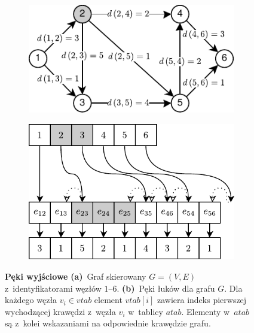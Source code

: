 \begin{figure}[!htbp]
	\centering
	\null\hfill
	\begin{subfigure}[b]{0.54\textwidth}
		\includegraphics[width=\textwidth]{Chapter_I/FORWARD-STAR-Exapmle/a.pdf}
		\caption{}
		\label{fig:forwardStarRepresentation:a}
	\end{subfigure}%
	\hfill
	\begin{subfigure}[b]{0.43\textwidth}
		\includegraphics[width=\textwidth]{Chapter_I/FORWARD-STAR-Exapmle/b.pdf}
		\caption{}
		\label{fig:forwardStarRepresentation:b}
	\end{subfigure}
	\hfill\null
	\caption{
		\textbf{Pęki wyjściowe}
		\textbf{(a)}~Graf skierowany $G = \left( V, E \right)$ z~identyfikatorami węzłów $1$--$6$.
		\textbf{(b)}~Pęki łuków dla grafu $G$.
		Dla każdego węzła $v_{i} \in vtab$ element $vtab \left[ i \right]$ zawiera indeks pierwszej wychodzącej krawędzi z~węzła $v_{i}$ w~tablicy $atab$.
		Elementy w~$atab$ są z~kolei wskazaniami na odpowiednie krawędzie grafu.
	}
	\label{fig:forwardStarRepresentation}
\end{figure}

